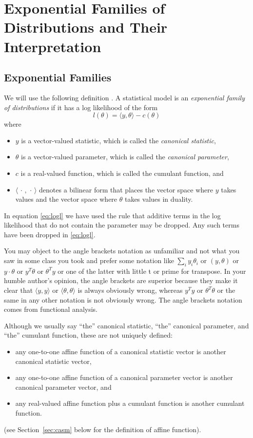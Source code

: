 \documentclass[11pt]{article}
\begin{document}
\section{Exponential Families of Distributions and Their Interpretation}

\subsection{Exponential Families} \label{sec:expfam}

We will use the following definition \citep{geyer-gdor}.
A statistical model is an \emph{exponential family of distributions} if it has
a log likelihood of the form
\begin{equation} \label{eq:logl}
   l(\theta) = \langle y, \theta \rangle - c(\theta)
\end{equation}
where
\begin{itemize}
\item $y$ is a vector-valued statistic, which is called
   the \emph{canonical statistic},
\item $\theta$ is a vector-valued parameter, which is called
   the \emph{canonical parameter},
\item $c$ is a real-valued function, which is called
   the {cumulant function}, and
\item $\langle \,\cdot\,, \,\cdot\, \rangle$ denotes a bilinear
   form that places the vector space where $y$ takes values and the vector
   space where $\theta$ takes values in duality.
\end{itemize}

In equation \eqref{eq:logl} we have used the rule that additive terms
in the log likelihood that do not contain the parameter may be dropped.
Any such terms have been dropped in \eqref{eq:logl}.

You may object to the angle brackets notation as unfamiliar and not
what you saw in some class you took and prefer some notation like
$\sum_i y_i \theta_i$ or
$(y, \theta)$ or $y \cdot \theta$ or $y^T \theta$ or $\theta^T y$ or one
of the latter with little t or prime for transpose.
In your humble author's opinion, the angle brackets are superior because
they make it clear that $\langle y, y \rangle$
or $\langle \theta, \theta \rangle$ is always obviously wrong,
whereas $y^T y$ or $\theta^T \theta$ or the same in any other notation
is not obviously wrong.
The angle brackets notation comes from functional analysis.

Although we usually say ``the'' canonical statistic, ``the'' canonical parameter,
and ``the'' cumulant function, these are not uniquely defined:
\begin{itemize}
\item any one-to-one affine function of a canonical statistic vector is another
   canonical statistic vector,
\item any one-to-one affine function of a canonical parameter vector is another
   canonical parameter vector, and
\item any real-valued affine function plus a cumulant function is another
   cumulant function.
\end{itemize}
(see Section~\ref{sec:casm} below for the definition of affine function).
\end{document}
